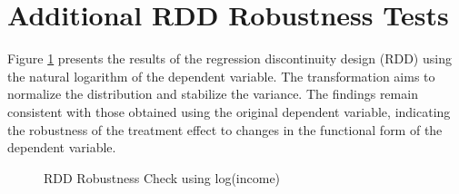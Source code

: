 \documentclass[11pt]{article}
\begin{document}
\clearpage

\section{Additional RDD Robustness Tests} \label{sec:additional_rdd}
% 

Figure \ref{fig:RD_design_Robust} presents the results of the regression discontinuity design (RDD) using the natural logarithm of the dependent variable. The transformation aims to normalize the distribution and stabilize the variance. The findings remain consistent with those obtained using the original dependent variable, indicating the robustness of the treatment effect to changes in the functional form of the dependent variable.

\begin{figure}[ht]
  \centering
  \hfill %
  \hfill %
  \caption{RDD Robustness Check using log(income)}
  \label{fig:RD_design_Robust}
\end{figure}
\end{document}
